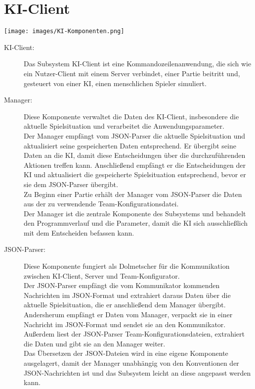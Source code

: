 \section{KI-Client}
\begin{center}
	\texttt{[image: images/KI-Komponenten.png]}
\end{center}


\begin{description}
	\item[KI-Client:] 
	Das Subsystem KI-Client ist eine Kommandozeilenanwendung, die sich wie ein Nutzer-Client mit einem Server verbindet, einer Partie beitritt und, gesteuert von einer KI, einen menschlichen Spieler simuliert. 
	\\
	\item[Manager:]
	Diese Komponente verwaltet die Daten des KI-Client, insbesondere die aktuelle Spielsituation und verarbeitet die Anwendungsparameter.\\ Der Manager empfängt vom JSON-Parser die aktuelle Spielsituation und aktualisiert seine gespeicherten Daten entsprechend. Er übergibt seine Daten an die KI, damit diese Entscheidungen über die durchzuführenden Aktionen treffen kann. Anschließend empfängt er die Entscheidungen der KI und aktualisiert die gespeicherte Spielsituation entsprechend, bevor er sie dem JSON-Parser übergibt.\\
	Zu Beginn einer Partie erhält der Manager vom JSON-Parser die Daten aus der zu verwendende Team-Konfigurationsdatei. \\
	Der Manager ist die zentrale Komponente des Subsystems und behandelt den Programmverlauf und die Parameter, damit die KI sich ausschließlich mit dem Entscheiden befassen kann.
	\\
	\item[JSON-Parser:]
	Diese Komponente fungiert als Dolmetscher für die Kommunikation zwischen KI-Client, Server und Team-Konfigurator.\\
	Der JSON-Parser empfängt die vom Kommunikator kommenden Nachrichten im JSON-Format und extrahiert daraus Daten über die aktuelle Spielsituation, die er anschließend dem Manager übergibt. Andersherum empfängt er Daten vom Manager, verpackt sie in einer Nachricht im JSON-Format und sendet sie an den Kommunikator.\\
	Außerdem liest der JSON-Parser Team-Konfigurationsdateien, extrahiert die Daten und gibt sie an den Manager weiter.\\
	Das Übersetzen der JSON-Dateien wird in eine eigene Komponente ausgelagert, damit der Manager unabhängig von den Konventionen der JSON-Nachrichten ist und das Subsystem leicht an diese angepasst werden kann.

\end{description}
